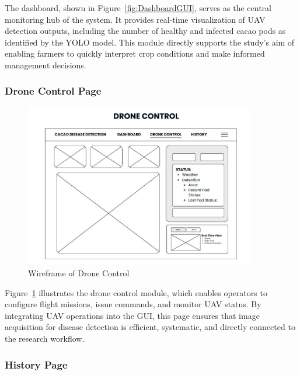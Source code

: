 The dashboard, shown in Figure~\ref{fig:DashboardGUI}, serves as the central monitoring hub of the system. It provides real-time visualization of UAV detection outputs, including the number of healthy and infected cacao pods as identified by the YOLO model. This module directly supports the study’s aim of enabling farmers to quickly interpret crop conditions and make informed management decisions.

\subsubsection*{Drone Control Page}

\begin{figure}[H]
	\centering
	\caption{Wireframe of Drone Control}
	\label{fig:DroneControlGUI}
	\includegraphics[width=0.9\textwidth]{figures/Drone Control.pdf}
\end{figure}

Figure~\ref{fig:DroneControlGUI} illustrates the drone control module, which enables operators to configure flight missions, issue commands, and monitor UAV status. By integrating UAV operations into the GUI, this page ensures that image acquisition for disease detection is efficient, systematic, and directly connected to the research workflow.

\subsubsection*{History Page}

